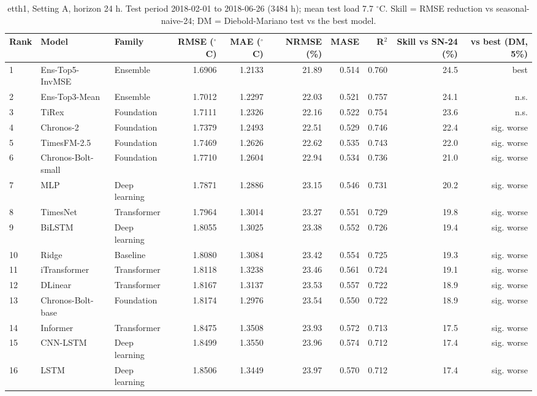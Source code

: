 \begin{table}[ht]
\centering
\small
\caption{etth1, Setting A, horizon 24 h. Test period 2018-02-01 to 2018-06-26 (3484 h); mean test load 7.7 $^\circ$C. Skill = RMSE reduction vs seasonal-naive-24; DM = Diebold-Mariano test vs the best model.}
\label{tab:etth1_A_H24_full}
\begin{tabular}{lllrrrrrrr}
\toprule
Rank & Model & Family & RMSE ($^\circ$C) & MAE ($^\circ$C) & NRMSE (\%) & MASE & R$^2$ & Skill vs SN-24 (\%) & vs best (DM, 5\%) \\
\midrule
1 & Ens-Top5-InvMSE & Ensemble & 1.6906 & 1.2133 & 21.89 & 0.514 & 0.760 & 24.5 & best \\
2 & Ens-Top3-Mean & Ensemble & 1.7012 & 1.2297 & 22.03 & 0.521 & 0.757 & 24.1 & n.s. \\
3 & TiRex & Foundation & 1.7111 & 1.2326 & 22.16 & 0.522 & 0.754 & 23.6 & n.s. \\
4 & Chronos-2 & Foundation & 1.7379 & 1.2493 & 22.51 & 0.529 & 0.746 & 22.4 & sig. worse \\
5 & TimesFM-2.5 & Foundation & 1.7469 & 1.2626 & 22.62 & 0.535 & 0.743 & 22.0 & sig. worse \\
6 & Chronos-Bolt-small & Foundation & 1.7710 & 1.2604 & 22.94 & 0.534 & 0.736 & 21.0 & sig. worse \\
7 & MLP & Deep learning & 1.7871 & 1.2886 & 23.15 & 0.546 & 0.731 & 20.2 & sig. worse \\
8 & TimesNet & Transformer & 1.7964 & 1.3014 & 23.27 & 0.551 & 0.729 & 19.8 & sig. worse \\
9 & BiLSTM & Deep learning & 1.8055 & 1.3025 & 23.38 & 0.552 & 0.726 & 19.4 & sig. worse \\
10 & Ridge & Baseline & 1.8080 & 1.3084 & 23.42 & 0.554 & 0.725 & 19.3 & sig. worse \\
11 & iTransformer & Transformer & 1.8118 & 1.3238 & 23.46 & 0.561 & 0.724 & 19.1 & sig. worse \\
12 & DLinear & Transformer & 1.8167 & 1.3137 & 23.53 & 0.557 & 0.722 & 18.9 & sig. worse \\
13 & Chronos-Bolt-base & Foundation & 1.8174 & 1.2976 & 23.54 & 0.550 & 0.722 & 18.9 & sig. worse \\
14 & Informer & Transformer & 1.8475 & 1.3508 & 23.93 & 0.572 & 0.713 & 17.5 & sig. worse \\
15 & CNN-LSTM & Deep learning & 1.8499 & 1.3550 & 23.96 & 0.574 & 0.712 & 17.4 & sig. worse \\
16 & LSTM & Deep learning & 1.8506 & 1.3449 & 23.97 & 0.570 & 0.712 & 17.4 & sig. worse \\

\end{tabular}
\end{table}
